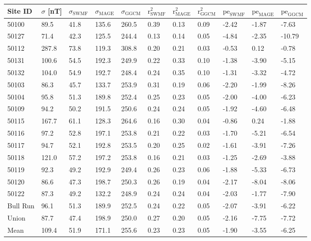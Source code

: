 \begin{tabular}{l p{1cm} p{1cm} p{1cm} p{1cm} p{1cm} p{1cm} p{1cm} p{1cm} p{1cm} p{1cm}}
Site ID & $\sigma$ [nT] & $\sigma_\text{SWMF}$ & $\sigma_\text{MAGE}$ & $\sigma_\text{GGCM}$ & $\text{r}^2_\text{SWMF}$ & $\text{r}^2_\text{MAGE}$ & $\text{r}^2_\text{GGCM}$ & $\text{pe}_\text{SWMF}$ & $\text{pe}_\text{MAGE}$ & $\text{pe}_\text{GGCM}$ \\
\hline
50100 & 89.5 & 41.8 & 135.6 & 260.5 & 0.39 & 0.13 & 0.09 & -2.42 & -1.87 & -7.63 \\
50127 & 71.4 & 42.3 & 125.5 & 244.4 & 0.13 & 0.14 & 0.05 & -4.84 & -2.35 & -10.79 \\
50112 & 287.8 & 73.8 & 119.3 & 308.8 & 0.20 & 0.21 & 0.03 & -0.53 & 0.12 & -0.78 \\
50131 & 100.6 & 54.5 & 192.3 & 249.9 & 0.22 & 0.33 & 0.10 & -1.38 & -3.90 & -5.15 \\
50132 & 104.0 & 54.9 & 192.7 & 248.4 & 0.24 & 0.35 & 0.10 & -1.31 & -3.32 & -4.72 \\
50103 & 86.3 & 45.7 & 133.7 & 253.9 & 0.31 & 0.19 & 0.06 & -2.20 & -1.99 & -8.26 \\
50104 & 95.8 & 51.3 & 189.8 & 252.4 & 0.25 & 0.23 & 0.05 & -2.00 & -4.00 & -6.23 \\
50109 & 94.2 & 50.2 & 191.5 & 250.6 & 0.24 & 0.24 & 0.05 & -1.92 & -4.60 & -6.48 \\
50115 & 167.7 & 61.1 & 128.3 & 264.6 & 0.16 & 0.30 & 0.04 & -0.86 & 0.24 & -1.88 \\
50116 & 97.2 & 52.8 & 197.1 & 253.8 & 0.21 & 0.22 & 0.03 & -1.70 & -5.21 & -6.54 \\
50117 & 94.7 & 52.1 & 192.8 & 253.5 & 0.20 & 0.25 & 0.02 & -1.61 & -3.91 & -7.26 \\
50118 & 121.0 & 57.2 & 197.2 & 253.8 & 0.16 & 0.21 & 0.03 & -1.25 & -2.69 & -3.88 \\
50119 & 92.3 & 49.2 & 192.9 & 249.4 & 0.26 & 0.23 & 0.06 & -1.88 & -5.33 & -6.73 \\
50120 & 86.6 & 47.3 & 198.7 & 250.3 & 0.26 & 0.19 & 0.04 & -2.17 & -8.04 & -8.06 \\
50122 & 87.3 & 49.2 & 132.2 & 248.9 & 0.24 & 0.24 & 0.04 & -2.03 & -1.77 & -7.90 \\
Bull Run & 96.1 & 51.3 & 189.9 & 252.5 & 0.24 & 0.22 & 0.05 & -2.07 & -3.91 & -6.22 \\
Union & 87.7 & 47.4 & 198.9 & 250.0 & 0.27 & 0.20 & 0.05 & -2.16 & -7.75 & -7.72 \\
\hline
Mean & 109.4 & 51.9 & 171.1 & 255.6 & 0.23 & 0.23 & 0.05 & -1.90 & -3.55 & -6.25 \\
\end{tabular}
